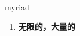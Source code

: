 
\begin{frame}
{\huge myriad}
\begin{center}
\begin{enumerate}\Large
  \item \textbf{无限的，大量的}
\end{enumerate}
\end{center}
\end{frame}
